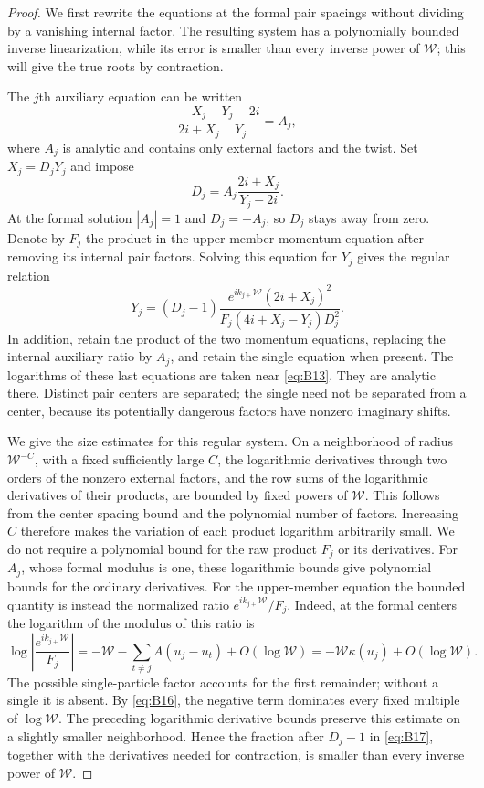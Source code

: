 \begin{proof}
We first rewrite the equations at the formal pair spacings without
dividing by a vanishing internal factor.  The resulting system has a
polynomially bounded inverse linearization, while its error is smaller
than every inverse power of $\mathcal W$; this will give the true roots
by contraction.

The
$j$th auxiliary equation can be written
\[
 \frac{X_j}{2i+X_j}\frac{Y_j-2i}{Y_j}=A_j,
\]
where $A_j$ is analytic and contains only external factors and the twist.
Set $X_j=D_jY_j$ and impose
\[
 D_j=A_j\frac{2i+X_j}{Y_j-2i}.
\]
At the formal solution $|A_j|=1$ and $D_j=-A_j$, so $D_j$ stays away
from zero.  Denote
by $F_j$ the product in the upper-member momentum equation after removing
its internal pair factors.  Solving this equation for $Y_j$ gives the
regular relation
\begin{equation}\label{eq:B17}
 Y_j=(D_j-1)
 \frac{e^{ik_{j+}\mathcal W}(2i+X_j)^2}
      {F_j(4i+X_j-Y_j)D_j^2}.
\end{equation}
In addition, retain the product of the two momentum equations, replacing
the internal auxiliary ratio by $A_j$, and retain the single equation
when present.  The logarithms of these last equations are taken near
\eqref{eq:B13}.  They are analytic there.  Distinct pair centers are
separated; the single need not be separated from a center, because its
potentially dangerous factors have nonzero imaginary shifts.

We give the size estimates for this regular system.  On a neighborhood
of radius $\mathcal W^{-C}$, with a fixed sufficiently large $C$, the
logarithmic derivatives through two orders of the nonzero external
factors, and the row sums of the logarithmic derivatives of their
products, are bounded by fixed powers of $\mathcal W$.
This follows from the center spacing
bound and the polynomial number of factors.  Increasing $C$ therefore
makes the variation of each product logarithm arbitrarily small.
We do not require a polynomial bound for the raw product $F_j$ or its
derivatives.  For $A_j$, whose formal modulus is one, these logarithmic
bounds give polynomial bounds for the ordinary derivatives.  For the
upper-member equation the bounded quantity is instead the normalized
ratio $e^{ik_{j+}\mathcal W}/F_j$.
Indeed, at the formal centers the logarithm of the modulus of this
ratio is
\[
 \log\left|\frac{e^{ik_{j+}\mathcal W}}{F_j}\right|
 =-\mathcal W-\sum_{t\ne j}A(u_j-u_t)+O(\log\mathcal W)
 =-\mathcal W\kappa(u_j)+O(\log\mathcal W).
\]
The possible single-particle factor accounts for the first remainder;
without a single it is absent.  By \eqref{eq:B16}, the negative term
dominates every fixed multiple of $\log\mathcal W$.
The preceding logarithmic derivative bounds preserve this estimate on
a slightly smaller neighborhood.  Hence the fraction after $D_j-1$
in \eqref{eq:B17}, together with the derivatives needed for contraction,
is smaller than every inverse power of $\mathcal W$.


\end{proof}
